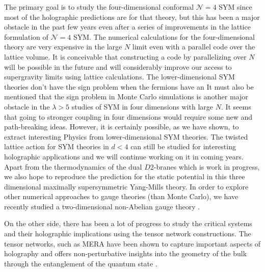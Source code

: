 The primary goal is to study the four-dimensional conformal $\mathcal{N}=4$ SYM 
since most of the holographic predictions are for that theory, but this has been a major obstacle
 in the past few years even after a series of improvements in the lattice formulation of $\mathcal{N}=4$ SYM. 
The numerical calculations for the four-dimensional theory are very expensive in the large $N$ limit
even with a parallel code over the lattice volume. It is conceivable that constructing a code by 
parallelizing over $N$ will be possible in the future and will considerably improve our access to 
supergravity limits using lattice calculations. 
The lower-dimensional SYM theories don't have the sign problem when the fermions have an 
It must also be mentioned that the sign problem in Monte Carlo simulations is another major 
obstacle in the $\lambda > 5$ studies of SYM in four dimensions with large $N$. It seems that 
going to stronger coupling in four dimensions would require some new and path-breaking ideas. 
However, it is certainly possible, as we have shown, to extract interesting Physics from 
lower-dimensional SYM theories. The twisted lattice action for SYM theories in $d <4$ can still 
be studied for interesting holographic applications and 
we will continue working on it in coming years. Apart from the thermodynamics of the dual 
$D2$-branes which is work in progress, we also hope to reproduce the prediction for the static 
potential in this three dimensional maximally supersymmetric Yang-Mills theory. In order to 
explore other numerical approaches to gauge theories (than Monte Carlo), 
we have recently studied a two-dimensional non-Abelian gauge theory \cite{Bazavov:2019qih}. 

On the other side, there has been a lot of progress to study the critical systems and their holographic
implications using the tensor network constructions. 
The tensor networks, such as MERA \cite{2008PhRvL.101k0501V} 
have been shown to capture important aspects of holography and offers non-perturbative 
insights into the geometry of the bulk through the entanglement of the quantum state 
\cite{Swingle:2009bg, 2015PhRvL.115t0401E, 2011JSP...145..891E, 
2018RvMP...90c5007N, VanRaamsdonk:2009ar, Headrick:2018ctr}.

